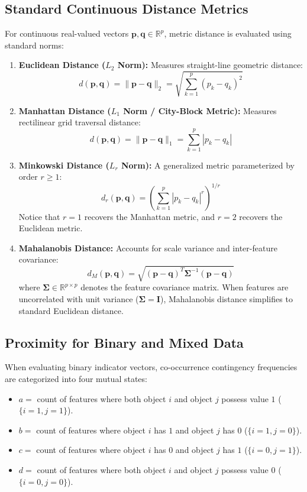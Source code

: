 \subsection{Standard Continuous Distance Metrics}
For continuous real-valued vectors $\mathbf{p}, \mathbf{q} \in \mathbb{R}^p$, metric distance is evaluated using standard norms:
\begin{enumerate}
    \item \textbf{Euclidean Distance ($L_2$ Norm):} Measures straight-line geometric distance:
    \begin{equation}
        d(\mathbf{p}, \mathbf{q}) = \|\mathbf{p} - \mathbf{q}\|_2 = \sqrt{\sum_{k=1}^p (p_k - q_k)^2}
    \end{equation}
    \item \textbf{Manhattan Distance ($L_1$ Norm / City-Block Metric):} Measures rectilinear grid traversal distance:
    \begin{equation}
        d(\mathbf{p}, \mathbf{q}) = \|\mathbf{p} - \mathbf{q}\|_1 = \sum_{k=1}^p |p_k - q_k|
    \end{equation}
    \item \textbf{Minkowski Distance ($L_r$ Norm):} A generalized metric parameterized by order $r \ge 1$:
    \begin{equation}
        d_r(\mathbf{p}, \mathbf{q}) = \left( \sum_{k=1}^p |p_k - q_k|^r \right)^{1/r}
    \end{equation}
    Notice that $r = 1$ recovers the Manhattan metric, and $r = 2$ recovers the Euclidean metric.
    \item \textbf{Mahalanobis Distance:} Accounts for scale variance and inter-feature covariance:
    \begin{equation}
        d_M(\mathbf{p}, \mathbf{q}) = \sqrt{(\mathbf{p} - \mathbf{q})^T \boldsymbol{\Sigma}^{-1} (\mathbf{p} - \mathbf{q})}
    \end{equation}
    where $\boldsymbol{\Sigma} \in \mathbb{R}^{p \times p}$ denotes the feature covariance matrix. When features are uncorrelated with unit variance ($\boldsymbol{\Sigma} = \mathbf{I}$), Mahalanobis distance simplifies to standard Euclidean distance.
\end{enumerate}

\subsection{Proximity for Binary and Mixed Data}
When evaluating binary indicator vectors, co-occurrence contingency frequencies are categorized into four mutual states:
\begin{itemize}
    \item $a = $ count of features where both object $i$ and object $j$ possess value $1$ ($\{i=1, j=1\}$).
    \item $b = $ count of features where object $i$ has $1$ and object $j$ has $0$ ($\{i=1, j=0\}$).
    \item $c = $ count of features where object $i$ has $0$ and object $j$ has $1$ ($\{i=0, j=1\}$).
    \item $d = $ count of features where both object $i$ and object $j$ possess value $0$ ($\{i=0, j=0\}$).
\end{itemize}

